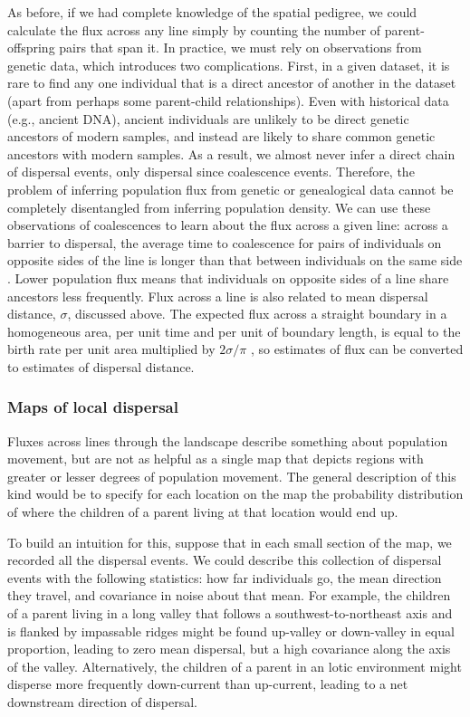 \documentclass{ar-1col}
\begin{document}
As before, if we had complete knowledge of the spatial pedigree,
we could calculate the flux across any line simply by counting the number of
parent-offspring pairs that span it.
In practice, we must rely on observations from genetic data,
which introduces two complications.
First, in a given dataset, it is rare to find any one individual
that is a direct ancestor of another in the dataset
(apart from perhaps some parent-child relationships).
Even with historical data (e.g., ancient DNA),
ancient individuals are unlikely to be direct genetic ancestors of modern samples,
and instead are likely to share common genetic ancestors with modern samples.
As a result, we almost never infer a direct chain of dispersal events,
only dispersal since coalescence events.
Therefore, the problem of inferring population flux from genetic or genealogical data
cannot be completely disentangled from inferring population density.
We can use these observations of coalescences to learn about the flux across a given line:
across a barrier to dispersal,
the average time to coalescence for pairs of individuals on opposite sides of the line
is longer than that between individuals on the same side \citep{bedassle,ringbauer2018estimating}.
Lower population flux means that individuals on opposite sides of a line share ancestors
less frequently.
Flux across a line is also related to mean dispersal distance, $\sigma$, discussed above.
The expected flux across a straight boundary in a homogeneous area,
per unit time and per unit of boundary length,
is equal to the birth rate per unit area multiplied by $2 \sigma / \pi$
\citep{buffon1777},
so estimates of flux can be converted to estimates of dispersal distance.


\subsubsection{Maps of local dispersal}


Fluxes across lines through the landscape
describe something about population movement,
but are not as helpful 
as a single map that depicts regions with greater or lesser degrees of population movement.
The general description of this kind would be 
to specify for each location on the map
the probability distribution of where 
the children of a parent living at that location would end up.

To build an intuition for this,
suppose that in each small section of the map,
we recorded all the dispersal events.
We could describe this collection of dispersal events 
with the following statistics:
how far individuals go,
the mean direction they travel,
and covariance in noise about that mean.
For example, the children of a parent 
living in a long valley that follows a southwest-to-northeast axis 
and is flanked by impassable ridges might be found up-valley 
or down-valley in equal proportion, 
leading to zero mean dispersal,
but a high covariance along the axis of the valley.
Alternatively, the children of a parent in an lotic environment 
might disperse more frequently down-current than up-current, 
leading to a net downstream direction of dispersal.
\end{document}
